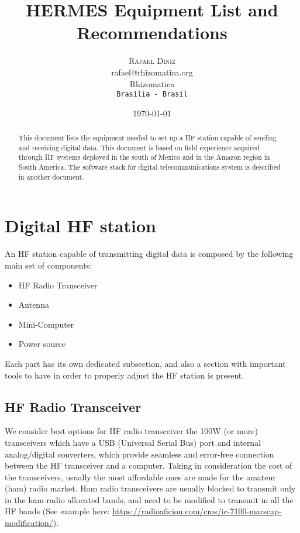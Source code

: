 \documentclass[11pt,a4paper]{article}
\title{HERMES Equipment List and Recommendations}
\author{
       \large
        \textsc{Rafael Diniz}
        \mbox{}\\ %
        rafael@rhizomatica.org\\
        \mbox{Rhizomatica} \\ %
        \normalsize
        \texttt{Brasília - Brasil}\\
}
\date{\today}
\begin{document}
\maketitle

\begin{abstract}
This document lists the equipment needed to set up a HF station capable
of sending and receiving digital data. This document is based on field
experience acquired through HF systems deployed in the south of Mexico
and in the Amazon region in South America. The software stack for digital
telecommunications system is described in another document.
\end{abstract}

\newpage

\tableofcontents

\section{Digital HF station}

An HF station capable of transmitting digital data is composed by the
following main set of components:

\begin{itemize}
\item HF Radio Transceiver
\item Antenna
\item Mini-Computer
\item Power source
\end{itemize}

Each part has its own dedicated subsection, and also a section with
important tools to have in order to properly adjust the HF station is
present.

\subsection{HF Radio Transceiver}

We consider best options for HF radio transceiver the 100W (or more)
transceivers which have a USB (Universal Serial Bus) port and internal
analog/digital converters, which provide seamless and error-free
connection between the HF transceiver and a computer. Taking in
consideration the cost of the transceivers, usually the most affordable ones
are made for the amateur (ham) radio market. Ham radio transceivers are
usually blocked to transmit only in the ham radio allocated bands, and need
to be modified to transmit in all the HF bands (See example here:
\url{https://radioaficion.com/cms/ic-7100-marscap-modification/}).
\end{document}

